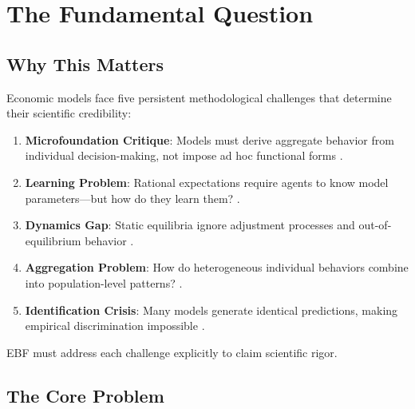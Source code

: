
\section{The Fundamental Question}
\label{sec:az-fundamental}

\subsection{Why This Matters}

Economic models face five persistent methodological challenges that determine
their scientific credibility:

\begin{enumerate}
\item \textbf{Microfoundation Critique}: Models must derive aggregate behavior
from individual decision-making, not impose ad hoc functional forms
\citep{lucas1976econometric}.

\item \textbf{Learning Problem}: Rational expectations require agents to know
model parameters---but how do they learn them? \citep{sargent1993bounded}.

\item \textbf{Dynamics Gap}: Static equilibria ignore adjustment processes and
out-of-equilibrium behavior \citep{arthur2021foundations}.

\item \textbf{Aggregation Problem}: How do heterogeneous individual behaviors
combine into population-level patterns? \citep{kirman1992whom}.

\item \textbf{Identification Crisis}: Many models generate identical predictions,
making empirical discrimination impossible \citep{manski1995identification}.
\end{enumerate}

EBF must address each challenge explicitly to claim scientific rigor.

\subsection{The Core Problem}

